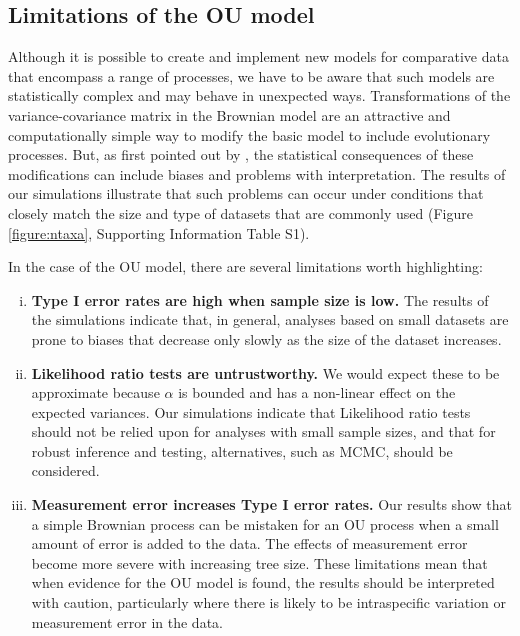 \documentclass[a4paper,12pt]{article}
\begin{document}
  \subsection{Limitations of the OU model}
  Although it is possible to create and implement new models for comparative data that encompass a range of processes, we have to be aware that such models are statistically complex and may behave in unexpected ways. 
  Transformations of the variance-covariance matrix in the Brownian model \citep[e.g. $\lambda$;][]{Pagel:1997aa} are an attractive and computationally simple way to modify the basic model to include evolutionary processes. 
  But, as first pointed out by \citet{grafen1989phylogenetic}, the statistical consequences of these modifications can include biases and problems with interpretation. 
  The results of our simulations illustrate that such problems can occur under conditions that closely match the size and type of datasets that are commonly used (Figure \ref{figure:ntaxa}, Supporting Information Table S1).
  
  In the case of the OU model, there are several limitations worth highlighting:
\begin{enumerate}[(i)]
  \item \textbf{Type I error rates are high when sample size is low.} 
  The results of the simulations indicate that, in general, analyses based on small datasets are prone to biases that decrease only slowly as the size of the dataset increases.  
  \item \textbf{Likelihood ratio tests are untrustworthy.}
  We would expect these to be approximate because $\alpha$ is bounded and has a non-linear effect on the expected variances. 
  Our simulations indicate that Likelihood ratio tests should not be relied upon for analyses with small sample sizes, and that for robust inference and testing, alternatives, such as MCMC, should be considered. 
  \item \textbf{Measurement error increases Type I error rates.} 
  Our results show that a simple Brownian process can be mistaken for an OU process when a small amount of error is added to the data. 
  The effects of measurement error become more severe with increasing tree size.
  These limitations mean that when evidence for the OU model is found, the results should be interpreted with caution, particularly where there is likely to be intraspecific variation or measurement error in the data.
\end{enumerate}

 
\end{document}
